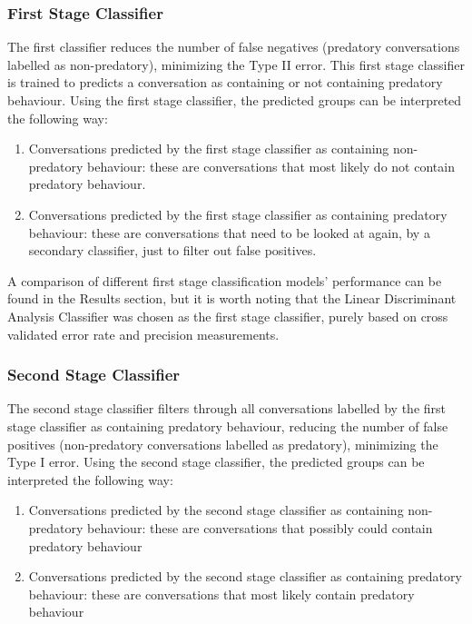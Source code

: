 \documentclass[11pt]{article}
\begin{document}
\subsubsection{First Stage Classifier}
The first classifier reduces the number of false negatives (predatory conversations labelled as non-predatory), minimizing the Type II error.
This first stage classifier is trained to predicts a conversation as containing or not containing predatory behaviour. Using the first stage classifier, the predicted groups can be interpreted the following way: 
\begin{enumerate}
    \item Conversations predicted by the first stage classifier as containing non-predatory behaviour: these are conversations that most likely do not contain predatory behaviour.
    \item Conversations predicted by the first stage classifier as containing predatory behaviour: these are conversations that need to be looked at again, by a secondary classifier, just to filter out false positives.
\end{enumerate}

A comparison of different first stage classification models' performance can be found in the Results section, but it is worth noting that the Linear Discriminant Analysis Classifier was chosen as the first stage classifier, purely based on cross validated error rate and precision measurements.

\subsubsection{Second Stage Classifier}
The second stage classifier filters through all conversations labelled by the first stage classifier as containing predatory behaviour, reducing the number of false positives (non-predatory conversations labelled as predatory), minimizing the Type I error. Using the second stage classifier, the predicted groups can be interpreted the following way: 
\begin{enumerate}
    \item Conversations predicted by the second stage classifier as containing non-predatory behaviour: these are conversations that possibly could contain predatory behaviour
    \item Conversations predicted by the second stage classifier as containing predatory behaviour: these are conversations that most likely contain predatory behaviour
\end{enumerate}
\end{document}

